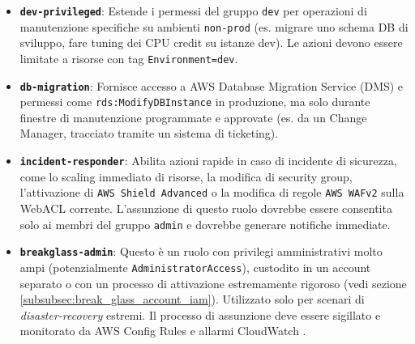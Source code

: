 \begin{itemize}
  \item \textbf{\texttt{dev‑privileged}}: Estende i permessi del gruppo \texttt{dev} per operazioni di manutenzione specifiche su ambienti \texttt{non‑prod} (es. migrare uno schema DB di sviluppo, fare tuning dei CPU credit su istanze dev). Le azioni devono essere limitate a risorse con tag \texttt{Environment=dev}.  
  \item \textbf{\texttt{db‑migration}}: Fornisce accesso a AWS Database Migration Service (DMS) e permessi come \texttt{rds:ModifyDBInstance} in produzione, ma solo durante finestre di manutenzione programmate e approvate (es. da un Change Manager, tracciato tramite un sistema di ticketing).  
  \item \textbf{\texttt{incident‑responder}}: Abilita azioni rapide in caso di incidente di sicurezza, come lo scaling immediato di risorse, la modifica di security group, l'attivazione di \texttt{AWS Shield Advanced} o la modifica di regole \texttt{AWS WAFv2} sulla WebACL corrente. L'assunzione di questo ruolo dovrebbe essere consentita solo ai membri del gruppo \texttt{admin} e dovrebbe generare notifiche immediate.  
  \item \textbf{\texttt{breakglass‑admin}}: Questo è un ruolo con privilegi amministrativi molto ampi (potenzialmente \texttt{AdministratorAccess}), custodito in un account separato o con un processo di attivazione estremamente rigoroso (vedi sezione \ref{subsubsec:break_glass_account_iam}). Utilizzato solo per scenari di \emph{disaster‑recovery} estremi. Il processo di assunzione deve essere sigillato e monitorato da AWS Config Rules e allarmi CloudWatch \cite{AWSSTS}.  
\end{itemize}

